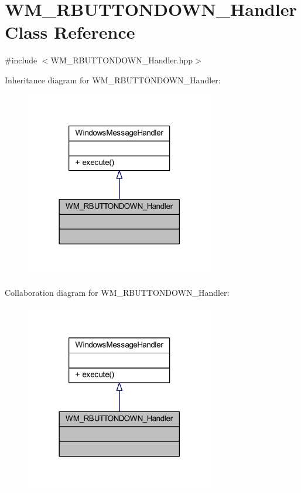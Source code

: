 \hypertarget{class_w_m___r_b_u_t_t_o_n_d_o_w_n___handler}{}\section{W\+M\+\_\+\+R\+B\+U\+T\+T\+O\+N\+D\+O\+W\+N\+\_\+\+Handler Class Reference}
\label{class_w_m___r_b_u_t_t_o_n_d_o_w_n___handler}


{\ttfamily \#include $<$W\+M\+\_\+\+R\+B\+U\+T\+T\+O\+N\+D\+O\+W\+N\+\_\+\+Handler.\+hpp$>$}



Inheritance diagram for W\+M\+\_\+\+R\+B\+U\+T\+T\+O\+N\+D\+O\+W\+N\+\_\+\+Handler\+:\nopagebreak
\begin{figure}[H]
\begin{center}
\leavevmode
\includegraphics[width=234pt]{class_w_m___r_b_u_t_t_o_n_d_o_w_n___handler__inherit__graph}
\end{center}
\end{figure}


Collaboration diagram for W\+M\+\_\+\+R\+B\+U\+T\+T\+O\+N\+D\+O\+W\+N\+\_\+\+Handler\+:\nopagebreak
\begin{figure}[H]
\begin{center}
\leavevmode
\includegraphics[width=234pt]{class_w_m___r_b_u_t_t_o_n_d_o_w_n___handler__coll__graph}
\end{center}
\end{figure}
